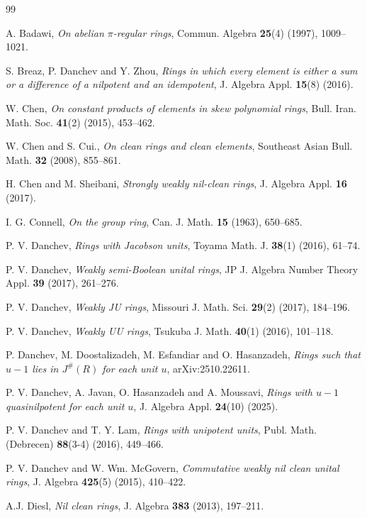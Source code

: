 \documentclass[12pt]{amsart}
\begin{document}
\vskip3.0pc

\begin{thebibliography}{99} 	

A. Badawi, {\it On abelian $\pi$-regular rings}, Commun. Algebra {\bf 25}(4) (1997), 1009--1021.	

S. Breaz, P. Danchev and Y. Zhou, {\it Rings in which every element is either a sum or a difference of a nilpotent and an idempotent}, J. Algebra Appl. {\bf 15}(8) (2016).

W. Chen, {\it On constant products of elements in skew polynomial rings}, Bull. Iran. Math. Soc. {\bf 41}(2) (2015), 453--462.

W. Chen and S. Cui., {\it On clean rings and clean elements}, Southeast Asian Bull. Math. {\bf 32} (2008),   855--861.

H. Chen and M. Sheibani, {\it Strongly weakly nil-clean rings}, J. Algebra Appl. {\bf 16} (2017).

I. G. Connell, {\it On the group ring}, Can. J. Math. {\bf 15} (1963), 650--685.

P. V. Danchev, {\it Rings with Jacobson units}, Toyama Math. J. {\bf 38}(1) (2016), 61--74.

P. V. Danchev, {\it Weakly semi-Boolean unital rings}, JP J. Algebra Number Theory Appl. {\bf 39} (2017), 261--276.

P. V. Danchev, {\it Weakly JU rings},  Missouri J. Math. Sci. {\bf 29}(2) (2017), 184--196.

P. V. Danchev, {\it Weakly UU rings}, Tsukuba J. Math. {\bf 40}(1) (2016), 101--118.

P. Danchev, M. Doostalizadeh, M. Esfandiar and O. Hasanzadeh, {\it Rings such that $u-1$ lies in $J^{\#}(R)$ for each unit $u$}, arXiv:2510.22611.

P. V. Danchev, A. Javan, O. Hasanzadeh and A. Moussavi, {\it Rings with $u-1$ quasinilpotent for each unit $u$}, J. Algebra Appl. {\bf 24}(10) (2025).

P. V. Danchev and T. Y. Lam, {\it Rings with unipotent units}, Publ. Math. (Debrecen) {\bf 88}(3-4) (2016), 449--466.

P. V. Danchev and W. Wm. McGovern, {\it Commutative weakly nil clean unital rings}, J. Algebra {\bf 425}(5) (2015), 410--422.

A.J. Diesl, {\it Nil clean rings}, J. Algebra {\bf 383} (2013), 197--211.


\end{thebibliography}
\end{document}
